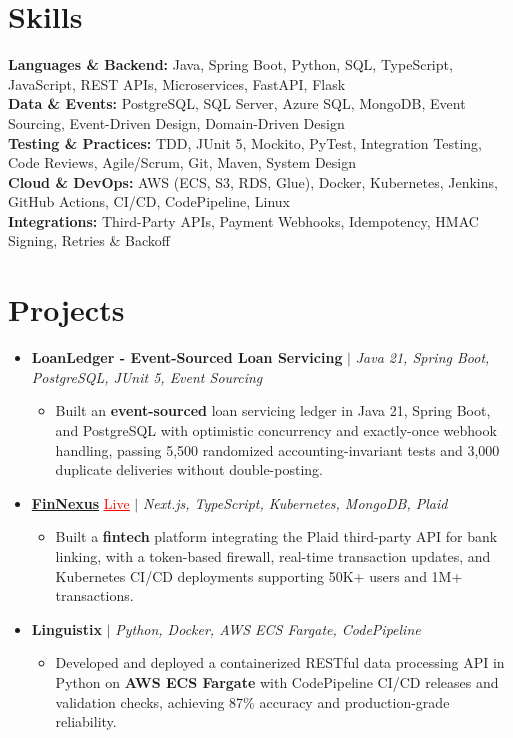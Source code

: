 \documentclass[letterpaper,10pt]{article}
\newcommand{\itemTail}{\vspace{-4pt}}
\newcommand{\sectionGap}{\vspace{-8pt}}
\newcommand{\projGap}{\vspace{3pt}}
\newcommand{\resumeItem}[1]{\item\small{{#1 \itemTail}}}
\newcommand{\resumeProjectHeading}[1]{\item \small #1 \vspace{-2pt}}
\newcommand{\resumeProjectLink}[2]{\href{#1}{\textcolor{red}{\underline{#2}}}}
\newcommand{\resumeSubHeadingListStart}{\begin{itemize}[leftmargin=0.0in, label={}]}
\newcommand{\resumeSubHeadingListEnd}{\end{itemize}}
\newcommand{\resumeProjItemListStart}{\begin{itemize}[leftmargin=0.15in,label=\textbullet,itemsep=3pt,topsep=0pt,parsep=0pt,partopsep=0pt]}
\newcommand{\resumeProjItemListEnd}{\end{itemize}\vspace{-4pt}}
\begin{document}
\section{Skills}
\begin{itemize}[leftmargin=0.15in, label={}]
\small{\item{
\textbf{Languages \& Backend:} Java, Spring Boot, Python, SQL, TypeScript, JavaScript, REST APIs, Microservices, FastAPI, Flask \\
\textbf{Data \& Events:} PostgreSQL, SQL Server, Azure SQL, MongoDB, Event Sourcing, Event-Driven Design, Domain-Driven Design \\
\textbf{Testing \& Practices:} TDD, JUnit 5, Mockito, PyTest, Integration Testing, Code Reviews, Agile/Scrum, Git, Maven, System Design \\
\textbf{Cloud \& DevOps:} AWS (ECS, S3, RDS, Glue), Docker, Kubernetes, Jenkins, GitHub Actions, CI/CD, CodePipeline, Linux \\
\textbf{Integrations:} Third-Party APIs, Payment Webhooks, Idempotency, HMAC Signing, Retries \& Backoff
}}
\end{itemize}
\sectionGap
\section{Projects}
\resumeSubHeadingListStart
\vspace{3pt}
\resumeProjectHeading{\textbf{LoanLedger - Event-Sourced Loan Servicing} $|$ \emph{Java 21, Spring Boot, PostgreSQL, JUnit 5, Event Sourcing}}
\resumeProjItemListStart
\resumeItem{Built an \textbf{event-sourced} loan servicing ledger in Java 21, Spring Boot, and PostgreSQL with optimistic concurrency and exactly-once webhook handling, passing 5,500 randomized accounting-invariant tests and 3,000 duplicate deliveries without double-posting.}
\resumeProjItemListEnd
\projGap
\resumeProjectHeading{\href{https://fin-nexus.vercel.app/}{\textbf{FinNexus}} \resumeProjectLink{https://fin-nexus.vercel.app/}{Live} $|$ \emph{Next.js, TypeScript, Kubernetes, MongoDB, Plaid}}
\resumeProjItemListStart
\resumeItem{Built a \textbf{fintech} platform integrating the Plaid third-party API for bank linking, with a token-based firewall, real-time transaction updates, and Kubernetes CI/CD deployments supporting 50K+ users and 1M+ transactions.}
\resumeProjItemListEnd
\projGap
\resumeProjectHeading{\textbf{Linguistix} $|$ \emph{Python, Docker, AWS ECS Fargate, CodePipeline}}
\resumeProjItemListStart
\resumeItem{Developed and deployed a containerized RESTful data processing API in Python on \textbf{AWS ECS Fargate} with CodePipeline CI/CD releases and validation checks, achieving 87\% accuracy and production-grade reliability.}
\resumeProjItemListEnd
\resumeSubHeadingListEnd
\end{document}
